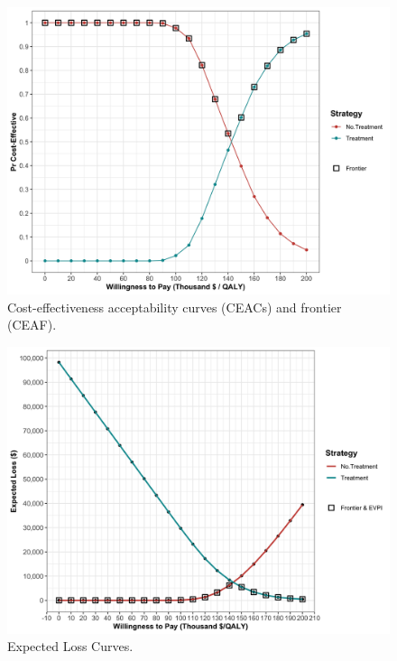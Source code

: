 \documentclass[]{book}
\begin{document}
\begin{figure}

{\centering \includegraphics[width=33.33in]{../figs/05b_ceac_ceaf} 

}

\caption{Cost-effectiveness acceptability curves (CEACs) and frontier (CEAF).}\label{fig:05b-ceac-ceaf}
\end{figure}

\begin{figure}

{\centering \includegraphics[width=33.33in]{../figs/05b_elc} 

}

\caption{Expected Loss Curves.}\label{fig:05b-elc}
\end{figure}
\end{document}
